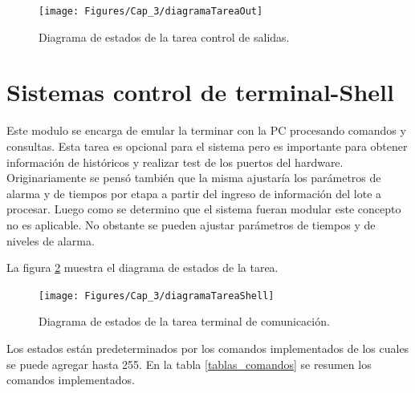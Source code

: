 \begin{figure}[h!]
	\centering
	\texttt{[image: Figures/Cap\_3/diagramaTareaOut]}
	\caption{ Diagrama de estados de la tarea control de salidas. }
	\label{fig:diag_TareasOut}
\end{figure}

\section{ Sistemas control de terminal-Shell }
Este modulo se encarga de emular la terminar con la PC procesando comandos y consultas. Esta tarea es opcional para el sistema pero es importante para obtener información de históricos y realizar test de los puertos del hardware. 
Originariamente se pensó también que la misma ajustaría los parámetros de alarma y de tiempos por etapa a partir del ingreso de información del lote a procesar. Luego como se determino que el sistema fueran modular este concepto no es aplicable. No obstante se pueden ajustar parámetros de tiempos y de niveles de alarma.

La figura \ref{fig:diag_TareasShell} muestra el diagrama de estados de la tarea.
\begin{figure}[h!]
	\centering
	\texttt{[image: Figures/Cap\_3/diagramaTareaShell]}
	\caption{ Diagrama de estados de la tarea terminal de comunicación. }
	\label{fig:diag_TareasShell}
\end{figure}

Los estados están predeterminados por los comandos implementados de los cuales se puede agregar hasta 255. En la tabla \ref{tablas_comandos} se resumen los comandos implementados.

